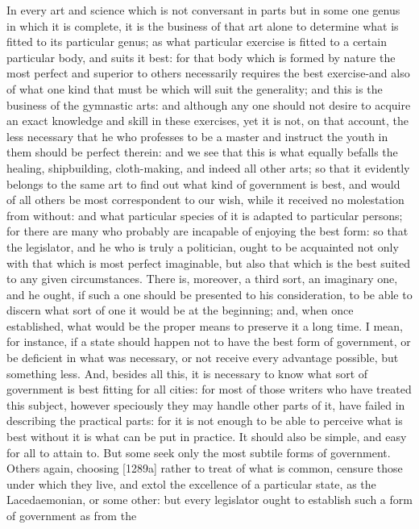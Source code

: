 In every art and science which is not conversant in parts but in some one
genus in which it is complete, it is the business of that art alone to
determine what is fitted to its particular genus; as what particular
exercise is fitted to a certain particular body, and suits it best: for
that body which is formed by nature the most perfect and superior to
others necessarily requires the best exercise-and also of what one kind
that must be which will suit the generality; and this is the business of
the gymnastic arts: and although any one should not desire to acquire an
exact knowledge and skill in these exercises, yet it is not, on that
account, the less necessary that he who professes to be a master and
instruct the youth in them should be perfect therein: and we see that this
is what equally befalls the healing, shipbuilding, cloth-making, and
indeed all other arts; so that it evidently belongs to the same art to
find out what kind of government is best, and would of all others be most
correspondent to our wish, while it received no molestation from without:
and what particular species of it is adapted to particular persons; for
there are many who probably are incapable of enjoying the best form: so
that the legislator, and he who is truly a politician, ought to be
acquainted not only with that which is most perfect imaginable, but also
that which is the best suited to any given circumstances. There is,
moreover, a third sort, an imaginary one, and he ought, if such a one
should be presented to his consideration, to be able to discern what sort
of one it would be at the beginning; and, when once established, what
would be the proper means to preserve it a long time. I mean, for
instance, if a state should happen not to have the best form of
government, or be deficient in what was necessary, or not receive every
advantage possible, but something less. And, besides all this, it is
necessary to know what sort of government is best fitting for all cities:
for most of those writers who have treated this subject, however
speciously they may handle other parts of it, have failed in describing
the practical parts: for it is not enough to be able to perceive what is
best without it is what can be put in practice. It should also be simple,
and easy for all to attain to. But some seek only the most subtile forms
of government. Others again, choosing [1289a] rather to treat of what is
common, censure those under which they live, and extol the excellence of a
particular state, as the Lacedaemonian, or some other: but every
legislator ought to establish such a form of government as from the
